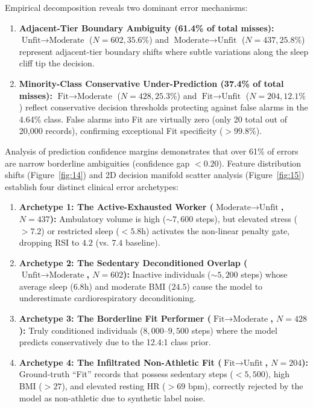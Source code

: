 \documentclass[11pt,a4paper]{article}
\begin{document}
Empirical decomposition reveals two dominant error mechanisms:
\begin{enumerate}[leftmargin=*,itemsep=1pt]
    \item \textbf{Adjacent-Tier Boundary Ambiguity (61.4\% of total misses):} $\text{Unfit} \to \text{Moderate}$ ($N=602, 35.6\%$) and $\text{Moderate} \to \text{Unfit}$ ($N=437, 25.8\%$) represent adjacent-tier boundary shifts where subtle variations along the sleep cliff tip the decision.
    \item \textbf{Minority-Class Conservative Under-Prediction (37.4\% of total misses):} $\text{Fit} \to \text{Moderate}$ ($N=428, 25.3\%$) and $\text{Fit} \to \text{Unfit}$ ($N=204, 12.1\%$) reflect conservative decision thresholds protecting against false alarms in the 4.64\% class. False alarms into Fit are virtually zero (only 20 total out of 20,000 records), confirming exceptional Fit specificity ($>99.8\%$).
\end{enumerate}

Analysis of prediction confidence margins demonstrates that over 61\% of errors are narrow borderline ambiguities (confidence gap $<0.20$). Feature distribution shifts (Figure~\ref{fig:14}) and 2D decision manifold scatter analysis (Figure~\ref{fig:15}) establish four distinct clinical error archetypes:
\begin{enumerate}[leftmargin=*,itemsep=1pt]
    \item \textbf{Archetype 1: The Active-Exhausted Worker ($\text{Moderate} \to \text{Unfit}$, $N = 437$):} Ambulatory volume is high ($\sim 7{,}600$ steps), but elevated stress ($>7.2$) or restricted sleep ($<5.8$h) activates the non-linear penalty gate, dropping RSI to $4.2$ (vs. $7.4$ baseline).
    \item \textbf{Archetype 2: The Sedentary Deconditioned Overlap ($\text{Unfit} \to \text{Moderate}$, $N = 602$):} Inactive individuals ($\sim 5{,}200$ steps) whose average sleep ($6.8$h) and moderate BMI ($24.5$) cause the model to underestimate cardiorespiratory deconditioning.
    \item \textbf{Archetype 3: The Borderline Fit Performer ($\text{Fit} \to \text{Moderate}$, $N = 428$):} Truly conditioned individuals ($8{,}000\text{--}9{,}500$ steps) where the model predicts conservatively due to the 12.4:1 class prior.
    \item \textbf{Archetype 4: The Infiltrated Non-Athletic Fit ($\text{Fit} \to \text{Unfit}$, $N = 204$):} Ground-truth ``Fit'' records that possess sedentary steps ($<5{,}500$), high BMI ($>27$), and elevated resting HR ($>69$ bpm), correctly rejected by the model as non-athletic due to synthetic label noise.
\end{enumerate}
\end{document}
